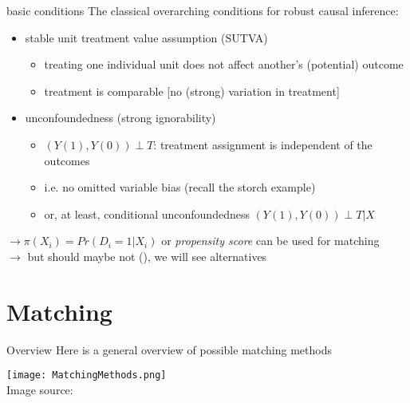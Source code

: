 \documentclass[aspectratio=169]{beamer}
\begin{document}
	\begin{frame}{basic conditions}
		The classical overarching conditions for robust causal inference:
		\\ \vspace*{.25cm}
		\begin{itemize}
			\item stable unit treatment value assumption (SUTVA)
			\begin{itemize}
				\item treating one individual unit does not affect another's (potential) outcome
				\item treatment is comparable [no (strong) variation in treatment]
			\end{itemize}
			\item<2-> unconfoundedness (strong ignorability)
			\begin{itemize}
				\item<2-> $(Y(1), Y(0)) \perp T$: treatment assignment is independent of the outcomes
				\item<2-> i.e. no omitted variable bias (recall the storch example)
				\item<2-> or, at least, conditional unconfoundedness  $(Y(1), Y(0)) \perp T {}|{} X$
			\end{itemize}
		\end{itemize}
		\vspace*{.25cm}  {$\rightarrow \pi(X_i) = Pr(D_i = 1 | X_i)$ or \textit{propensity score} can be used for matching}
		\\ \onslide<4> {$\rightarrow$ but should maybe not (\cite{King2019}), we will see alternatives }
	\end{frame}
\section{Matching}

	\begin{frame}{Overview}
		Here is a general overview of possible matching methods
		\\ \vspace*{.05cm}
		\begin{center}
			\texttt{[image: MatchingMethods.png]}
			\\\tiny{ Image source: \href{https://humboldt-wi.github.io/blog/research/applied_predictive_modeling_19/matching_methods/}{\underline{}}}
		\end{center}
	\end{frame}
\end{document}
